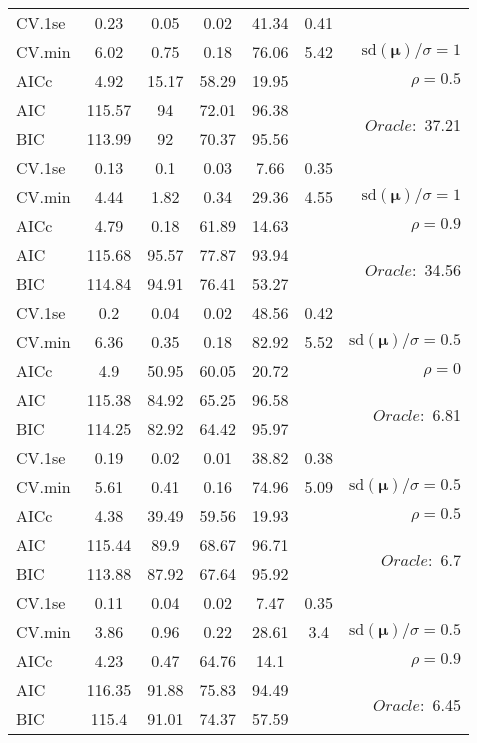\begin{table}
\begin{center}
\begin{tabular}{l*{5}{c}|r}
 \hline 
CV.1se & 0.23 & 0.05 & 0.02 & 41.34 & 0.41 & \\
CV.min & 6.02 & 0.75 & 0.18 & 76.06 & 5.42 &  $\mathrm{sd}(\mathbf{\mu})/\sigma=1$ \\
AICc & 4.92 & 15.17 & 58.29 & 19.95 & & $\rho=0.5$ \\
AIC & 115.57 & 94 & 72.01 & 96.38 & &  \multirow{2}{*}{$Oracle: $ 37.21} \\
BIC & 113.99 & 92 & 70.37 & 95.56 & &  \\
 \hline 
CV.1se & 0.13 & 0.1 & 0.03 & 7.66 & 0.35 & \\
CV.min & 4.44 & 1.82 & 0.34 & 29.36 & 4.55 &  $\mathrm{sd}(\mathbf{\mu})/\sigma=1$ \\
AICc & 4.79 & 0.18 & 61.89 & 14.63 & & $\rho=0.9$ \\
AIC & 115.68 & 95.57 & 77.87 & 93.94 & &  \multirow{2}{*}{$Oracle: $ 34.56} \\
BIC & 114.84 & 94.91 & 76.41 & 53.27 & &  \\
 \hline 
CV.1se & 0.2 & 0.04 & 0.02 & 48.56 & 0.42 & \\
CV.min & 6.36 & 0.35 & 0.18 & 82.92 & 5.52 &  $\mathrm{sd}(\mathbf{\mu})/\sigma=0.5$ \\
AICc & 4.9 & 50.95 & 60.05 & 20.72 & & $\rho=0$ \\
AIC & 115.38 & 84.92 & 65.25 & 96.58 & &  \multirow{2}{*}{$Oracle: $ 6.81} \\
BIC & 114.25 & 82.92 & 64.42 & 95.97 & &  \\
 \hline 
CV.1se & 0.19 & 0.02 & 0.01 & 38.82 & 0.38 & \\
CV.min & 5.61 & 0.41 & 0.16 & 74.96 & 5.09 &  $\mathrm{sd}(\mathbf{\mu})/\sigma=0.5$ \\
AICc & 4.38 & 39.49 & 59.56 & 19.93 & & $\rho=0.5$ \\
AIC & 115.44 & 89.9 & 68.67 & 96.71 & &  \multirow{2}{*}{$Oracle: $ 6.7} \\
BIC & 113.88 & 87.92 & 67.64 & 95.92 & &  \\
 \hline 
CV.1se & 0.11 & 0.04 & 0.02 & 7.47 & 0.35 & \\
CV.min & 3.86 & 0.96 & 0.22 & 28.61 & 3.4 &  $\mathrm{sd}(\mathbf{\mu})/\sigma=0.5$ \\
AICc & 4.23 & 0.47 & 64.76 & 14.1 & & $\rho=0.9$ \\
AIC & 116.35 & 91.88 & 75.83 & 94.49 & &  \multirow{2}{*}{$Oracle: $ 6.45} \\
BIC & 115.4 & 91.01 & 74.37 & 57.59 & &  \\
 \hline 
\end{tabular}
\end{center}
\vspace{-1cm}
\end{table}





